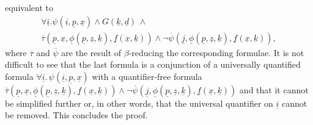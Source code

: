 \documentclass[conference]{IEEEtran}
\begin{document}
\begin{LONG}
\begin{IEEEproof}
  equivalent to
  \begin{multline*}
    \forall \underline{i}.\psi(\underline{i},\underline{p},\underline{x})
    \wedge 
    G(\underline{k}, \underline{d}) \,\wedge\, \\
    \overline{\tau}(\underline{p},\underline{x},
    \underline{\phi}(\underline{p},\underline{z},\underline{k}),
    \underline{f}(\underline{x}, \underline{k})) \wedge 
    \neg \overline{\psi}(\underline{j}, 
    \underline{\phi}(\underline{p},\underline{z},\underline{k}),
    \underline{f}(\underline{x}, \underline{k})) ,
  \end{multline*}
  where $\overline{\tau}$ and $\overline{\psi}$ are the result of
  $\beta$-reducing the corresponding formulae.  It is not difficult to
  see that the last formula is a conjunction of a universally
  quantified formula $\forall
  \underline{i}.\, \psi(\underline{i},\underline{p},\underline{x})$ with
  a quantifier-free formula $
  \overline{\tau}(\underline{p},\underline{x},
  \underline{\phi}(\underline{p},\underline{z},\underline{k}),
  \underline{f}(\underline{x}, \underline{k})) \wedge 
  \neg \overline{\psi}(\underline{j},
  \underline{\phi}(\underline{p},\underline{z},\underline{k}),
  \underline{f}(\underline{x}, \underline{k}))$ and that it cannot be
  simplified further or, in other words, that the universal
  quantifier on $\underline{i}$ cannot be removed.  This concludes the
  proof. 
\end{IEEEproof}


\end{LONG}
\end{document}

